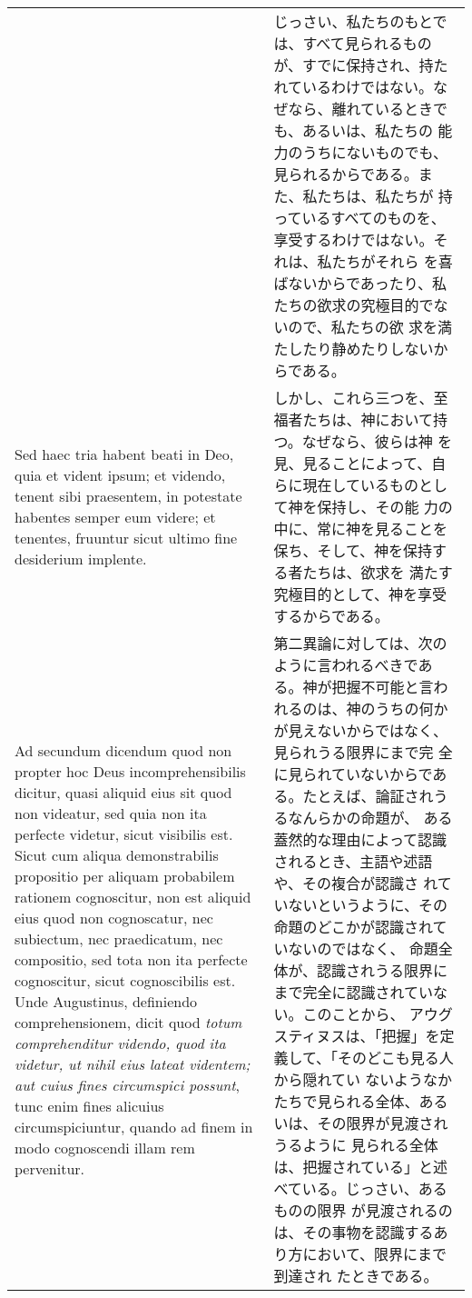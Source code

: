 \documentclass[10pt]{jsarticle} %
\begin{document}
\begin{longtable}{p{21em}p{21em}}
&

じっさい、私たちのもとでは、すべて見られるものが、すでに保持され、持た
れているわけではない。なぜなら、離れているときでも、あるいは、私たちの
能力のうちにないものでも、見られるからである。また、私たちは、私たちが
持っているすべてのものを、享受するわけではない。それは、私たちがそれら
を喜ばないからであったり、私たちの欲求の究極目的でないので、私たちの欲
求を満たしたり静めたりしないからである。

\\

Sed haec tria habent beati in Deo, quia et vident ipsum; et videndo,
tenent sibi praesentem, in potestate habentes semper eum videre; et
tenentes, fruuntur sicut ultimo fine desiderium implente.

&

しかし、これら三つを、至福者たちは、神において持つ。なぜなら、彼らは神
を見、見ることによって、自らに現在しているものとして神を保持し、その能
力の中に、常に神を見ることを保ち、そして、神を保持する者たちは、欲求を
満たす究極目的として、神を享受するからである。

\\

{\sc Ad secundum dicendum} quod non propter hoc Deus
incomprehensibilis dicitur, quasi aliquid eius sit quod non videatur,
sed quia non ita perfecte videtur, sicut visibilis est. Sicut cum
aliqua demonstrabilis propositio per aliquam probabilem rationem
cognoscitur, non est aliquid eius quod non cognoscatur, nec subiectum,
nec praedicatum, nec compositio, sed tota non ita perfecte
cognoscitur, sicut cognoscibilis est. Unde Augustinus, definiendo
comprehensionem, dicit quod {\it totum comprehenditur videndo, quod
ita videtur, ut nihil eius lateat videntem; aut cuius fines
circumspici possunt}, tunc enim fines alicuius circumspiciuntur,
quando ad finem in modo cognoscendi illam rem pervenitur.

&

第二異論に対しては、次のように言われるべきである。神が把握不可能と言わ
れるのは、神のうちの何かが見えないからではなく、見られうる限界にまで完
全に見られていないからである。たとえば、論証されうるなんらかの命題が、
ある蓋然的な理由によって認識されるとき、主語や述語や、その複合が認識さ
れていないというように、その命題のどこかが認識されていないのではなく、
命題全体が、認識されうる限界にまで完全に認識されていない。このことから、
アウグスティヌスは、「把握」を定義して、「そのどこも見る人から隠れてい
ないようなかたちで見られる全体、あるいは、その限界が見渡されうるように
見られる全体は、把握されている」と述べている。じっさい、あるものの限界
が見渡されるのは、その事物を認識するあり方において、限界にまで到達され
たときである。


\end{longtable}
\end{document}
